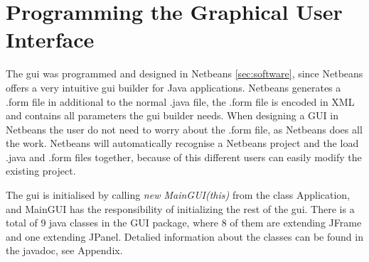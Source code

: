 \section{Programming the Graphical User Interface}
The \acrshort{gui} was programmed and designed in Netbeans \ref{sec:software}, since Netbeans offers a very intuitive \acrshort{gui} builder for Java applications. Netbeans generates a .form file in additional to the normal .java file, the .form file is encoded in XML and contains all parameters the \acrshort{gui} builder needs. When designing a GUI in Netbeans the user do not need to worry about the .form file, as Netbeans does all the work. Netbeans will automatically recognise a Netbeans project and the load .java and .form files together, because of this different users can easily modify the existing project.

The \acrshort{gui} is initialised by calling \textit{new MainGUI(this)} from the class Application, and MainGUI has the responsibility of initializing the rest of the \acrshort{gui}. There is a total of 9 java classes in the GUI package, where 8 of them are extending JFrame and one extending JPanel. Detalied information about the classes can be found in the javadoc, see Appendix.